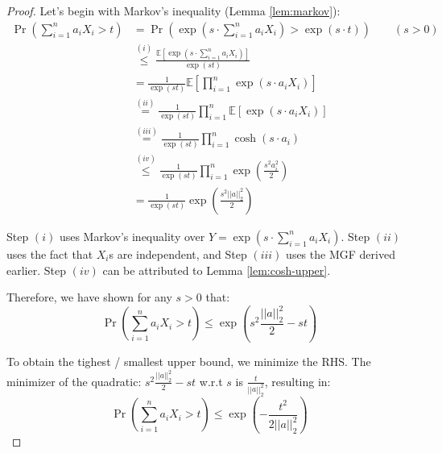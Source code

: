 \documentclass{article}
\theoremstyle{remark}
\newcommand{\Exp}{\mathbb{E}}
\begin{document}
\begin{proof}
Let's begin with Markov's inequality (Lemma \ref{lem:markov}):
\begin{align*}
\Pr\left(\sum_{i=1}^{n} a_{i}X_{i} > t\right) &= \Pr\left(\exp\left(s \cdot \sum_{i=1}^{n} a_{i}X_{i}\right) > \exp(s \cdot t)\right) \qquad (s > 0)\\
&\overset{(i)}\leq \frac{\Exp\left[\exp\left(s \cdot \sum\limits_{i=1}^{n} a_{i}X_{i}\right)\right]}{\exp(st)} \\
&= \frac{1}{\exp(st)} \Exp\left[\prod_{i=1}^{n} \exp(s \cdot a_{i}X_{i})\right] \\
&\overset{(ii)}= \frac{1}{\exp(st)} \prod_{i=1}^{n}\Exp\left[\exp(s \cdot a_{i}X_{i})\right] \\
&\overset{(iii)}= \frac{1}{\exp(st)} \prod_{i=1}^{n}\cosh(s\cdot a_{i}) \\
&\overset{(iv)}\leq \frac{1}{\exp(st)} \prod_{i=1}^{n}\exp\left(\frac{s^{2}a_{i}^{2}}{2}\right) \\
&= \frac{1}{\exp(st)} \exp\left(\frac{s^{2}||a||_{2}^{2}}{2}\right)
\end{align*}

Step \((i)\) uses Markov's inequality over \(Y = \exp\left(s \cdot \sum\limits_{i=1}^{n} a_{i}X_{i}\right)\). Step \((ii)\) uses the fact that \(X_{i}\)s are independent, and Step \((iii)\) uses the MGF derived earlier. Step \((iv)\) can be attributed to Lemma \ref{lem:cosh-upper}.

Therefore, we have shown for any \(s > 0\) that:
\begin{equation*}
\Pr\left(\sum_{i=1}^{n} a_{i}X_{i} > t\right) \leq \exp\left(s^{2}\frac{||a||_{2}^{2}}{2} - st\right)
\end{equation*}

To obtain the tighest / smallest upper bound, we minimize the RHS. The minimizer of the quadratic: \(s^{2}\frac{||a||_{2}^{2}}{2} - st\) w.r.t \(s\) is \(\frac{t}{||a||_{2}^{2}}\), resulting in:
\begin{equation*}
\Pr\left(\sum_{i=1}^{n} a_{i}X_{i} > t\right) \leq \exp\left(-\frac{t^{2}}{2||a||_{2}^{2}}\right)
\end{equation*}
\end{proof}
\end{document}
